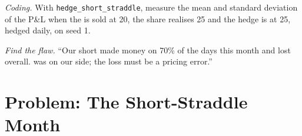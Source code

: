 \begin{exercise}[$\star\star\star$]\label{exo:dv:greeks-and-the-hedging-pnl:7}
\emph{Coding.} With \texttt{hedge\_short\_straddle}, measure the mean and standard
deviation of the P\&L when the  is sold at 20, the share realises 25 and the
hedge is at 25, hedged daily, on seed 1.
\end{exercise}

\begin{exercise}[$\star\star\star$]\label{exo:dv:greeks-and-the-hedging-pnl:8}
\emph{Find the flaw.} ``Our short  made money on 70\% of the days this month
and lost overall.  was on our side; the loss must be a pricing error.''
\end{exercise}

\section{Problem: The Short-Straddle Month}

